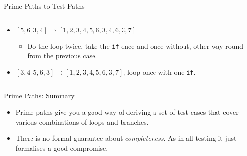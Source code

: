 \documentclass[handout]{beamer}
\newcommand{\recordingpause}{
\begin{frame}{Recording Pause}
  \begin{center}
    Recording Pause
  \end{center}
\end{frame}
}
\renewcommand{\recordingpause}{}
\begin{document}
\begin{frame}{Prime Paths to Test Paths}
\begin{columns}
\begin{column}{0.7\textwidth}
\begin{itemize}
\begin{itemize}
    \end{itemize}
  \item $[5,6,3,4] \rightarrow   [1,2,3,4,5,6,3,4,6,3,7]$
    \begin{itemize}
    \item Do the loop twice, take the {\tt if} once and once without,
      other way round from the previous case.
    \end{itemize}
  \item $[3,4,5,6,3] \rightarrow [1,2,3,4,5,6,3,7]$, loop once with
    one {\tt if}.
  \end{itemize}
\end{column}
\end{columns}
\end{frame}

\begin{frame}{Prime Paths: Summary}
  \begin{itemize}
  \item Prime paths give you a good way of deriving a set of test
    cases that cover various combinations of loops and branches.
  \item There is no formal guarantee about {\it completeness}. As in all
    testing it just formalises a good compromise. 
  \end{itemize}

\end{frame}

\recordingpause

% 
%
\end{document}
